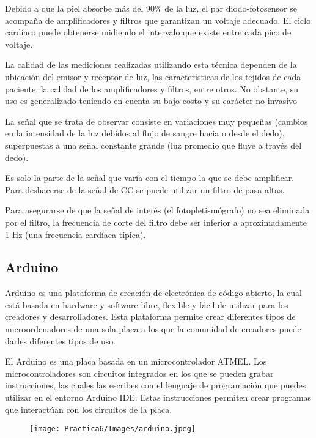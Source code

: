 \documentclass[12pt]{article}
\begin{document}
        Debido a que la piel absorbe más del  $90\%$ de la luz, el par diodo-fotosensor se acompaña de amplificadores y filtros que garantizan un voltaje adecuado. El ciclo cardíaco puede obtenerse midiendo el intervalo que existe entre cada pico de voltaje.
            
        La calidad de las mediciones realizadas utilizando esta técnica dependen de la ubicación del emisor y receptor de luz, las características de los tejidos de cada paciente, la calidad de los amplificadores y filtros, entre otros. No obstante, su uso es generalizado teniendo en cuenta su bajo costo y su carácter no invasivo
        
        La señal que se trata de observar consiste en variaciones muy pequeñas (cambios en la intensidad de la luz debidos al flujo de sangre hacia o desde el dedo), superpuestas a una señal constante grande (luz promedio que fluye a través del dedo).  
        
        Es solo la parte de la señal que varía con el tiempo la que se debe amplificar. Para deshacerse de la señal de CC se puede utilizar un filtro de pasa altas.   
        
        Para asegurarse de que la señal de interés (el fotopletismógrafo) no sea eliminada por el filtro, la frecuencia de corte del filtro debe ser inferior a aproximadamente 1 Hz (una frecuencia cardíaca típica).
        
        \subsection{Arduino}
        Arduino es una plataforma de creación de electrónica de código abierto, la cual está basada en hardware y software libre, flexible y fácil de utilizar para los creadores y desarrolladores. Esta plataforma permite crear diferentes tipos de microordenadores de una sola placa a los que la comunidad de creadores puede darles diferentes tipos de uso.
        
        El Arduino es una placa basada en un microcontrolador ATMEL. Los microcontroladores son circuitos integrados en los que se pueden grabar instrucciones, las cuales las escribes con el lenguaje de programación que puedes utilizar en el entorno Arduino IDE. Estas instrucciones permiten crear programas que interactúan con los circuitos de la placa.
        
        \begin{figure}[h!]
                \centering
                \texttt{[image: Practica6/Images/arduino.jpeg]}
            \end{figure}
            
\end{document}

